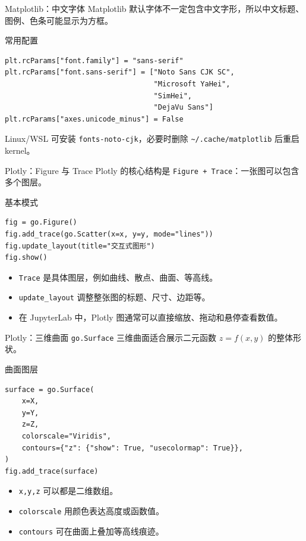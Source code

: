 \documentclass[aspectratio=169,11pt]{ctexbeamer}
\begin{document}
\begin{frame}[fragile]{Matplotlib：中文字体}
  Matplotlib 默认字体不一定包含中文字形，所以中文标题、图例、色条可能显示为方框。

  \begin{block}{常用配置}
\begin{Verbatim}[fontsize=\small]
plt.rcParams["font.family"] = "sans-serif"
plt.rcParams["font.sans-serif"] = ["Noto Sans CJK SC",
                                   "Microsoft YaHei",
                                   "SimHei",
                                   "DejaVu Sans"]
plt.rcParams["axes.unicode_minus"] = False
\end{Verbatim}
  \end{block}

  Linux/WSL 可安装 \texttt{fonts-noto-cjk}，必要时删除 \texttt{\textasciitilde/.cache/matplotlib} 后重启 kernel。
\end{frame}

\begin{frame}[fragile]{Plotly：Figure 与 Trace}
  Plotly 的核心结构是 \texttt{Figure + Trace}：一张图可以包含多个图层。

  \begin{block}{基本模式}
\begin{Verbatim}[fontsize=\small]
fig = go.Figure()
fig.add_trace(go.Scatter(x=x, y=y, mode="lines"))
fig.update_layout(title="交互式图形")
fig.show()
\end{Verbatim}
  \end{block}

  \begin{itemize}
    \item \texttt{Trace} 是具体图层，例如曲线、散点、曲面、等高线。
    \item \texttt{update\_layout} 调整整张图的标题、尺寸、边距等。
    \item 在 JupyterLab 中，Plotly 图通常可以直接缩放、拖动和悬停查看数值。
  \end{itemize}
\end{frame}

\begin{frame}[fragile]{Plotly：三维曲面 \texttt{go.Surface}}
  三维曲面适合展示二元函数 \(z=f(x,y)\) 的整体形状。

  \begin{block}{曲面图层}
\begin{Verbatim}[fontsize=\small]
surface = go.Surface(
    x=X,
    y=Y,
    z=Z,
    colorscale="Viridis",
    contours={"z": {"show": True, "usecolormap": True}},
)
fig.add_trace(surface)
\end{Verbatim}
  \end{block}

  \begin{itemize}
    \item \texttt{x,y,z} 可以都是二维数组。
    \item \texttt{colorscale} 用颜色表达高度或函数值。
    \item \texttt{contours} 可在曲面上叠加等高线痕迹。
  \end{itemize}
\end{frame}
\end{document}
